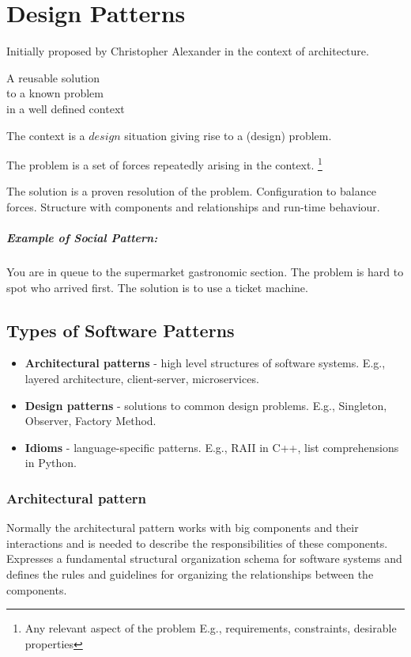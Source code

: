 \chapter{Design Patterns}

Initially proposed by Christopher Alexander in the context of architecture.

\begin{center}
  A reusable \textcolor[HTML]{FF6600}{solution}\\
  to a known \textcolor[HTML]{FF6600}{problem}\\
  in a well defined \textcolor[HTML]{FF6600}{context}\\
\end{center}

The context is a \(design\) situation giving rise to a (design) problem.


The problem is a set of forces repeatedly arising in the context. \footnote{Any relevant aspect of the problem E.g., requirements,
  constraints, desirable properties}

The solution is a proven resolution of the problem. Configuration to balance forces.
Structure with components and relationships and run-time behaviour.

\paragraph{Example of Social Pattern:} You are in queue to the supermarket gastronomic section.
The problem is hard to spot who arrived first. The solution is to use a ticket machine.

\section{Types of Software Patterns}

\begin{itemize}
  \item \textbf{Architectural patterns} - high level structures of software systems. E.g., layered architecture, client-server, microservices.
  \item \textbf{Design patterns} - solutions to common design problems. E.g., Singleton, Observer, Factory Method.
  \item \textbf{Idioms} - language-specific patterns. E.g., RAII in C++, list comprehensions in Python.
\end{itemize}

\subsection{Architectural pattern}
Normally the architectural pattern works with big components and their interactions and is needed to describe the responsibilities of these components.
Expresses a fundamental structural organization schema for software systems and defines the rules and guidelines for organizing the
relationships between the components.

